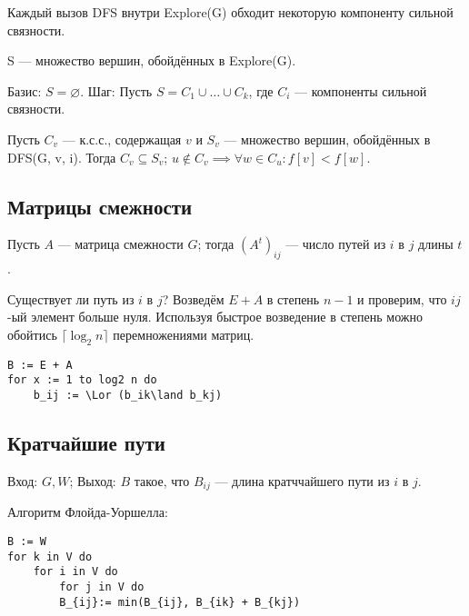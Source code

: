 Каждый вызов DFS внутри Explore(G) обходит некоторую компоненту сильной связности.

S --- множество вершин, обойдённых в Explore(G).

Базис: $S = \varnothing$.
Шаг: Пусть $S = C_1 \cup\ldots\cup C_k$, где $C_i$ --- компоненты сильной связности.

Пусть $C_v$ --- к.с.с., содержащая $v$ и $S_v$ --- множество вершин, обойдённых в DFS(G, v, i). Тогда $C_v \subseteq S_v$; $u\not\in C_v \implies \forall w \in C_u: f[v] < f[w]$.

\subsection{Матрицы смежности}
Пусть $A$ --- матрица смежности $G$; тогда $(A^t)_{ij}$ --- число путей из $i$ в $j$ длины $t$.

Существует ли путь из $i$ в $j$? Возведём $E+A$ в степень $n-1$ и проверим, что $ij$-ый элемент больше нуля. Используя быстрое возведение в степень можно обойтись $\lceil\log_2n\rceil$ перемножениями матриц.

\begin{lstlisting}
B := E + A
for x := 1 to log2 n do
    b_ij := \Lor (b_ik\land b_kj)
\end{lstlisting}

\subsection{Кратчайшие пути}
Вход: $G, W$;
Выход: $B$ такое, что $B_{ij}$ --- длина кратччайшего пути из $i$ в $j$.

Алгоритм Флойда-Уоршелла:

\begin{lstlisting}
B := W
for k in V do
    for i in V do
        for j in V do
        B_{ij}:= min(B_{ij}, B_{ik} + B_{kj})
\end{lstlisting}

